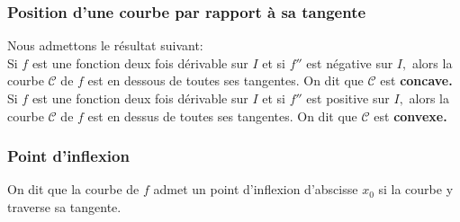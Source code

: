 \begin{example}
\subsubsection*{Position d'une courbe par rapport à sa tangente}
  Nous admettons le résultat suivant:\\ Si $ f $ est une fonction deux fois dérivable sur $ I $ et si $ f'' $ est négative sur $ I, $ alors la courbe $\mathcal{C} $ de $ f$ est en dessous de toutes ses tangentes. On dit  que  $\mathcal{C} $ est \textbf{\color{magenta} concave.}\\
   Si $ f $ est une fonction deux fois dérivable sur $ I $ et si $ f'' $ est positive sur $ I, $ alors la courbe $\mathcal{C} $ de $ f$ est en dessus de toutes ses tangentes. On dit  que  $\mathcal{C} $ est \textbf{\color{magenta} convexe.}
  \subsubsection*{Point d'inflexion}
  \begin{definition}
  On dit que la courbe de $ f $ admet un point d'inflexion d'abscisse $ x_{0} $ si la courbe y traverse sa tangente.
  \end{definition}
  
\end{example}
